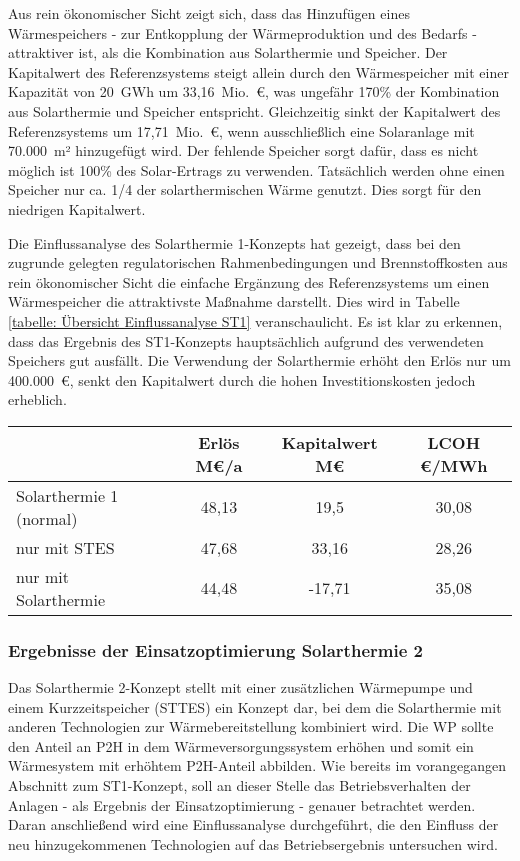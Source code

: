 Aus rein ökonomischer Sicht zeigt sich, dass das Hinzufügen eines Wärmespeichers - zur Entkopplung der Wärmeproduktion und des Bedarfs - attraktiver ist, als die Kombination aus Solarthermie und Speicher. Der Kapitalwert des Referenzsystems steigt allein durch den Wärmespeicher mit einer Kapazität von 20~GWh um 33,16~Mio.~\euro, was ungefähr 170\% der Kombination aus Solarthermie und Speicher entspricht. Gleichzeitig sinkt der Kapitalwert des Referenzsystems um 17,71~Mio.~\euro, wenn ausschließlich eine Solaranlage mit 70.000~m² hinzugefügt wird. Der fehlende Speicher sorgt dafür, dass es nicht möglich ist 100\% des Solar-Ertrags zu verwenden. Tatsächlich werden ohne einen Speicher nur ca. 1/4 der solarthermischen Wärme genutzt. Dies sorgt für den niedrigen Kapitalwert. 

Die Einflussanalyse des Solarthermie 1-Konzepts hat gezeigt, dass bei den zugrunde gelegten regulatorischen Rahmenbedingungen und Brennstoffkosten aus rein ökonomischer Sicht die einfache Ergänzung des Referenzsystems um einen Wärmespeicher die attraktivste Maßnahme darstellt. Dies wird in Tabelle \ref{tabelle: Übersicht Einflussanalyse ST1} veranschaulicht. Es ist klar zu erkennen, dass das Ergebnis des ST1-Konzepts hauptsächlich aufgrund des verwendeten Speichers gut ausfällt. Die Verwendung der Solarthermie erhöht den Erlös nur um 400.000~\euro, senkt den Kapitalwert durch die hohen Investitionskosten jedoch erheblich. 
	\begin{center}
		\label{tabelle: Übersicht Einflussanalyse ST1}
		\begin{tabular}{lcccc}
			\hline 
			 &  & Erlös M\euro/a & Kapitalwert M\euro & \ac{LCOH} \euro/MWh\tabularnewline
			 
			\hline 
			Solarthermie 1 (normal)  &  & 48,13 & 19,5 & 30,08 \tabularnewline
			nur mit \ac{STES}		 &  & 47,68 & 33,16 & 28,26 \tabularnewline
			nur mit Solarthermie 	 &  & 44,48 & -17,71 & 35,08 \tabularnewline		
			\hline
		\end{tabular}
	\end{center}

\subsubsection{Ergebnisse der Einsatzoptimierung Solarthermie 2}
Das Solarthermie 2-Konzept stellt mit einer zusätzlichen Wärmepumpe und einem Kurzzeitspeicher (\acs{STTES}) ein Konzept dar, bei dem die Solarthermie mit anderen Technologien zur Wärmebereitstellung kombiniert wird. Die \ac{WP} sollte den Anteil an \ac{P2H} in dem Wärmeversorgungssystem erhöhen und somit ein Wärmesystem mit erhöhtem \ac{P2H}-Anteil abbilden. Wie bereits im vorangegangen Abschnitt zum ST1-Konzept, soll an dieser Stelle das Betriebsverhalten der Anlagen - als Ergebnis der Einsatzoptimierung - genauer betrachtet werden. Daran anschließend wird eine Einflussanalyse durchgeführt, die den Einfluss der neu hinzugekommenen Technologien auf das Betriebsergebnis untersuchen wird. 

